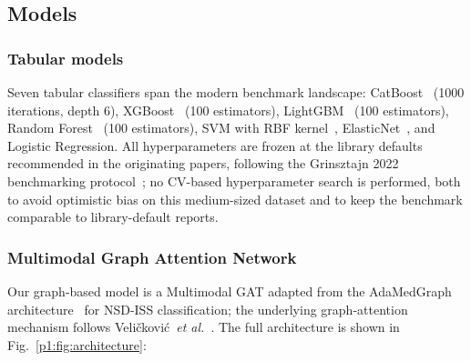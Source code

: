 \subsection{Models}

\subsubsection{Tabular models}
Seven tabular classifiers span the modern benchmark landscape: CatBoost~\cite{prokhorenkova2018catboost} (1000 iterations, depth 6), XGBoost~\cite{chen2016xgboost} (100 estimators), LightGBM~\cite{ke2017lightgbm} (100 estimators), Random Forest~\cite{breiman2001} (100 estimators), SVM with RBF kernel~\cite{cortes1995svm}, ElasticNet~\cite{zou2005elastic}, and Logistic Regression. All hyperparameters are frozen at the library defaults recommended in the originating papers, following the Grinsztajn 2022 benchmarking protocol~\cite{grinsztajn2022}; no CV-based hyperparameter search is performed, both to avoid optimistic bias on this medium-sized dataset and to keep the benchmark comparable to library-default reports.

\subsubsection{Multimodal Graph Attention Network}
Our graph-based model is a Multimodal GAT adapted from the AdaMedGraph architecture~\cite{adamedgraph} for NSD-ISS classification; the underlying graph-attention mechanism follows Veli\v{c}kovi\'{c}~\textit{et al.}~\cite{velickovic2018gat}. The full architecture is shown in Fig.~\ref{p1:fig:architecture}:

